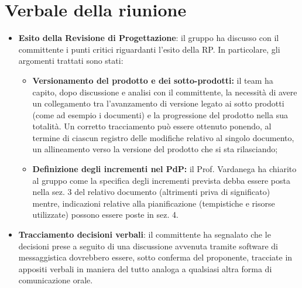 \section{Verbale della riunione}
	\begin{itemize}
		\item \textbf{Esito della Revisione di Progettazione}: il gruppo ha discusso con il committente i punti critici riguardanti l'esito della RP. In particolare, gli argomenti trattati sono stati:
		\begin{itemize}
			\item \textbf{Versionamento del prodotto e dei sotto-prodotti:} il team ha capito, dopo discussione e analisi con il committente, la necessità di avere un collegamento tra l'avanzamento di versione legato ai sotto prodotti (come ad esempio i documenti) e la progressione del prodotto nella sua totalità. Un corretto tracciamento può essere ottenuto ponendo, al termine di ciascun registro delle modifiche relativo al singolo documento, un allineamento verso la versione del prodotto che si sta rilasciando;
			\item \textbf{Definizione degli incrementi nel PdP:} il Prof. Vardanega ha chiarito al gruppo come la specifica degli incrementi prevista debba essere posta nella sez. 3 del relativo documento (altrimenti priva di significato) mentre, indicazioni relative alla pianificazione (tempistiche e risorse utilizzate) possono essere poste in sez. 4.
		\end{itemize}
		\item \textbf{Tracciamento decisioni verbali}: il committente ha segnalato che le decisioni prese a seguito di una discussione avvenuta tramite software di messaggistica dovrebbero essere, sotto conferma del proponente, tracciate in appositi verbali in maniera del tutto analoga a qualsiasi altra forma di comunicazione orale. 
	\end{itemize}
